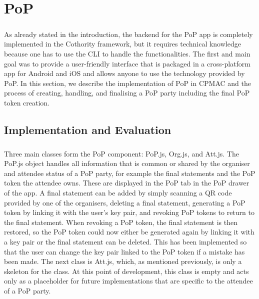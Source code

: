 \chapter{PoP}

\paragraph{}
As already stated in the introduction, the backend for the PoP app is completely implemented in the Cothority framework, but it requires technical knowledge because one has to use the CLI to handle the functionalities. The first and main goal was to provide a user-friendly interface that is packaged in a cross-platform app for Android and iOS and allows anyone to use the technology provided by PoP. In this section, we describe the implementation of PoP in CPMAC and the process of creating, handling, and finalising a PoP party including the final PoP token creation.

\section{Implementation and Evaluation}

\paragraph{}
Three main classes form the PoP component: PoP.js, Org.js, and Att.js. The PoP.js object handles all information that is common or shared by the organiser and attendee status of a PoP party, for example the final statements and the PoP token the attendee owns. These are displayed in the PoP tab in the PoP drawer of the app. A final statement can be added by simply scanning a QR code provided by one of the organisers, deleting a final statement, generating a PoP token by linking it with the user’s key pair, and revoking PoP tokens to return to the final statement. When revoking a PoP token, the final statement is then restored, so the PoP token could now either be generated again by linking it with a key pair or the final statement can be deleted. This has been implemented so that the user can change the key pair linked to the PoP token if a mistake has been made.
The next class is Att.js, which, as mentioned previously, is only a skeleton for the class. At this point of development, this class is empty and acts only as a placeholder for future implementations that are specific to the attendee of a PoP party.

